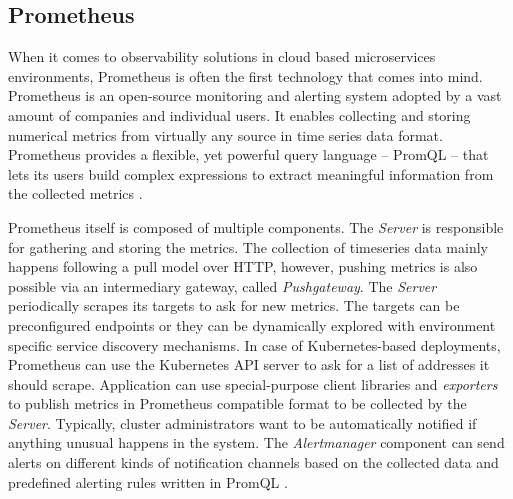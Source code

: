 \subsection{Prometheus}

When it comes to observability solutions in cloud based microservices environments, Prometheus is often the first technology that comes into mind. Prometheus is an open-source monitoring and alerting system adopted by a vast amount of companies and individual users. It enables collecting and storing numerical metrics from virtually any source in time series data format. Prometheus provides a flexible, yet powerful query language -- PromQL -- that lets its users build complex expressions to extract meaningful information from the collected metrics \cite{Prometheus}.

Prometheus itself is composed of multiple components. The \textit{Server} is responsible for gathering and storing the metrics. The collection of timeseries data mainly happens following a pull model over HTTP, however, pushing metrics is also possible via an intermediary gateway, called \textit{Pushgateway}. The \textit{Server} periodically scrapes its targets to ask for new metrics. The targets can be preconfigured endpoints or they can be dynamically explored with environment specific service discovery mechanisms. In case of Kubernetes-based deployments, Prometheus can use the Kubernetes API server to ask for a list of addresses it should scrape. Application can use special-purpose client libraries and \textit{exporters} to publish metrics in Prometheus compatible format to be collected by the \textit{Server}. Typically, cluster administrators want to be automatically notified if anything unusual happens in the system. The \textit{Alertmanager} component can send alerts on different kinds of notification channels based on the collected data and predefined alerting rules written in PromQL \cite{Prometheus}.


